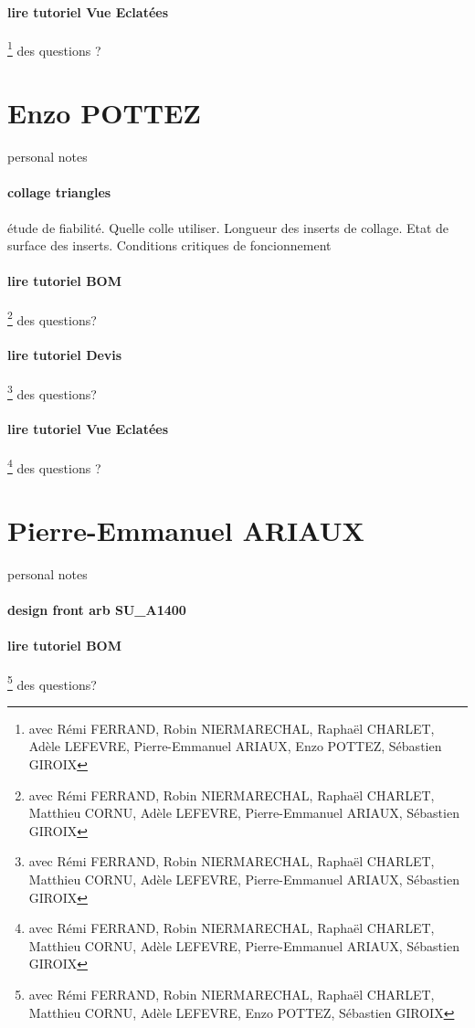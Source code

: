 \paragraph{lire tutoriel Vue Eclatées} \footnote{avec Rémi FERRAND, Robin NIERMARECHAL, Raphaël CHARLET, Adèle LEFEVRE, Pierre-Emmanuel ARIAUX, Enzo POTTEZ, Sébastien GIROIX} des questions ?
\newpage \section*{Enzo POTTEZ} 
 \par personal notes
\paragraph{collage triangles} étude de fiabilité. Quelle colle utiliser. Longueur des inserts de collage. Etat de surface des inserts. Conditions critiques de foncionnement
\paragraph{lire tutoriel BOM} \footnote{avec Rémi FERRAND, Robin NIERMARECHAL, Raphaël CHARLET, Matthieu CORNU, Adèle LEFEVRE, Pierre-Emmanuel ARIAUX, Sébastien GIROIX} des questions?
\paragraph{lire tutoriel Devis} \footnote{avec Rémi FERRAND, Robin NIERMARECHAL, Raphaël CHARLET, Matthieu CORNU, Adèle LEFEVRE, Pierre-Emmanuel ARIAUX, Sébastien GIROIX} des questions?
\paragraph{lire tutoriel Vue Eclatées} \footnote{avec Rémi FERRAND, Robin NIERMARECHAL, Raphaël CHARLET, Matthieu CORNU, Adèle LEFEVRE, Pierre-Emmanuel ARIAUX, Sébastien GIROIX} des questions ?
\newpage \section*{Pierre-Emmanuel ARIAUX} 
 \par personal notes
\paragraph{design front arb SU\_A1400} 
\paragraph{lire tutoriel BOM} \footnote{avec Rémi FERRAND, Robin NIERMARECHAL, Raphaël CHARLET, Matthieu CORNU, Adèle LEFEVRE, Enzo POTTEZ, Sébastien GIROIX} des questions?
